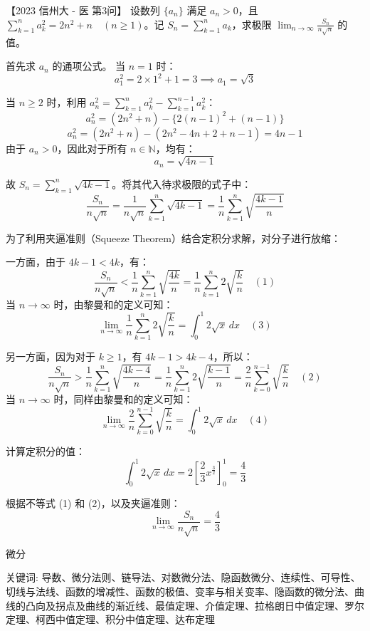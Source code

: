 \begin{questions}
\question
【2023 信州大 - 医 第3问】
设数列 $\{a_n\}$ 满足 $a_n > 0$，且 $\sum_{k=1}^{n} a_k^2 = 2n^2 + n \quad (n \ge 1)$。记 $S_n = \sum_{k=1}^{n} a_k$，求极限 $\lim_{n \to \infty} \frac{S_n}{n\sqrt{n}}$ 的值。

\begin{solution}
首先求 $a_n$ 的通项公式。
当 $n = 1$ 时：
\[
a_1^2 = 2 \times 1^2 + 1 = 3 \implies a_1 = \sqrt{3}
\]

当 $n \ge 2$ 时，利用 $a_n^2 = \sum_{k=1}^{n} a_k^2 - \sum_{k=1}^{n-1} a_k^2$：
\[
a_n^2 = (2n^2 + n) - \{2(n-1)^2 + (n-1)\}
\]
\[
a_n^2 = (2n^2 + n) - (2n^2 - 4n + 2 + n - 1) = 4n - 1
\]
由于 $a_n > 0$，因此对于所有 $n \in \mathbb{N}$，均有：
\[
a_n = \sqrt{4n - 1}
\]

故 $S_n = \sum_{k=1}^{n} \sqrt{4k - 1}$。将其代入待求极限的式子中：
\[
\frac{S_n}{n\sqrt{n}} = \frac{1}{n\sqrt{n}} \sum_{k=1}^{n} \sqrt{4k - 1} = \frac{1}{n} \sum_{k=1}^{n} \sqrt{\frac{4k - 1}{n}}
\]

为了利用夹逼准则（Squeeze Theorem）结合定积分求解，对分子进行放缩：

一方面，由于 $4k - 1 < 4k$，有：
\[
\frac{S_n}{n\sqrt{n}} < \frac{1}{n} \sum_{k=1}^{n} \sqrt{\frac{4k}{n}} = \frac{1}{n} \sum_{k=1}^{n} 2\sqrt{\frac{k}{n}} \quad (1)
\]
当 $n \to \infty$ 时，由黎曼和的定义可知：
\[
\lim_{n \to \infty} \frac{1}{n} \sum_{k=1}^{n} 2\sqrt{\frac{k}{n}} = \int_{0}^{1} 2\sqrt{x} \, dx \quad (3)
\]

另一方面，因为对于 $k \ge 1$，有 $4k - 1 > 4k - 4$，所以：
\[
\frac{S_n}{n\sqrt{n}} > \frac{1}{n} \sum_{k=1}^{n} \sqrt{\frac{4k - 4}{n}} = \frac{1}{n} \sum_{k=1}^{n} 2\sqrt{\frac{k-1}{n}} = \frac{2}{n} \sum_{k=0}^{n-1} \sqrt{\frac{k}{n}} \quad (2)
\]
当 $n \to \infty$ 时，同样由黎曼和的定义可知：
\[
\lim_{n \to \infty} \frac{2}{n} \sum_{k=0}^{n-1} \sqrt{\frac{k}{n}} = \int_{0}^{1} 2\sqrt{x} \, dx \quad (4)
\]

计算定积分的值：
\[
\int_{0}^{1} 2\sqrt{x} \, dx = 2 \left[ \frac{2}{3} x^{\frac{3}{2}} \right]_{0}^{1} = \frac{4}{3}
\]

根据不等式 (1) 和 (2)，以及夹逼准则：
\[
\lim_{n \to \infty} \frac{S_n}{n\sqrt{n}} = \frac{4}{3}
\]
\end{solution}
\end{questions}

\pagebreak

\begin{center}
  {\fontsize{30pt}{26pt}\selectfont
    \hypertarget{微分}{微分} \label{微分}
  }
\end{center}
\separator
\begin{center}
    关键词: 导数、微分法则、链导法、对数微分法、隐函数微分、连续性、可导性、切线与法线、函数的增减性、函数的极值、变率与相关变率、隐函数的微分法、曲线的凸向及拐点及曲线的渐近线、最值定理、介值定理、拉格朗日中值定理、罗尔定理、柯西中值定理、积分中值定理、达布定理
\end{center}
\vspace{0.5pt}

